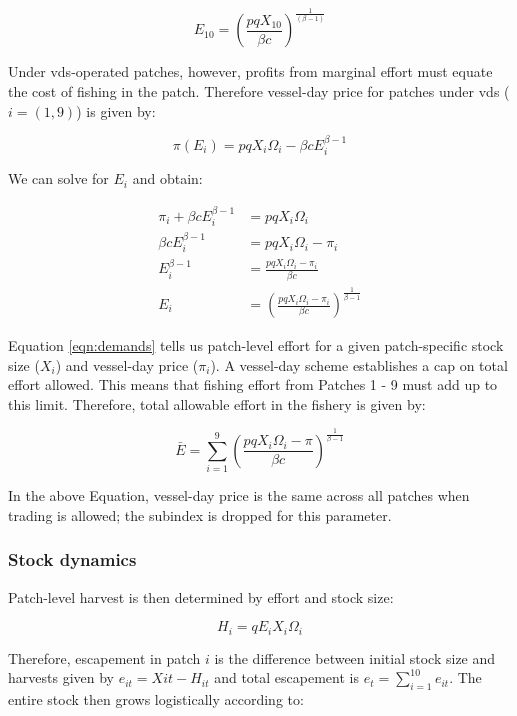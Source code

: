 \documentclass[12pt]{article}
\begin{document}
\begin{equation}
E_{10} = \left(\frac{pqX_{10}}{\beta c}\right)^{\frac{1}{(\beta - 1)}}
\label{eqn:effort_hs}
\end{equation}

Under vds-operated patches, however, profits from marginal effort must equate the cost of fishing in the patch. Therefore vessel-day price for patches under vds ($i = (1, 9)$) is  given by:

$$
\pi(E_i) = pqX_i\Omega_i - \beta c E_i ^{\beta - 1}
$$

We can solve for $E_i$ and obtain:

\begin{equation}
	\begin{split}
		\pi_i + \beta c E_i ^{\beta - 1} &= pqX_i\Omega_i \\
		\beta c E_i ^{\beta - 1} &= pqX_i\Omega_i - \pi_i \\
		E_i ^{\beta - 1} &= \frac{pqX_i\Omega_i - \pi_i}{\beta c} \\
		E_i &= \left(\frac{pqX_i\Omega_i - \pi_i}{\beta c }\right) ^ {\frac{1}{\beta - 1}}
	\end{split}
\label{eqn:demands}
\end{equation}

Equation \ref{eqn:demands} tells us patch-level effort for a given patch-specific stock size ($X_i$) and vessel-day price ($\pi_i$). A vessel-day scheme establishes a cap on total effort allowed. This means that fishing effort from Patches 1 - 9 must add up to this limit. Therefore, total allowable effort in the fishery is given by:

$$
\bar{E} = \sum_{i = 1}^9\left(\frac{pqX_i\Omega_i - \pi}{\beta c }\right) ^ {\frac{1}{\beta - 1}}
\label{eqn:Ebar}
$$

In the above Equation, vessel-day price is the same across all patches when trading is allowed; the subindex is dropped for this parameter.

\subsubsection{Stock dynamics}

Patch-level harvest is then determined by effort and stock size:

$$
H_i = qE_iX_i\Omega_i
\label{eqn:harvest}
$$

Therefore, escapement in patch $i$ is the difference between initial stock size and harvests given by $e_{it} = X{it} - H_{it}$ and total escapement is $e_t=\sum_{i=1}^{10}e_{it}$. The entire stock then grows logistically according to:
\end{document}
